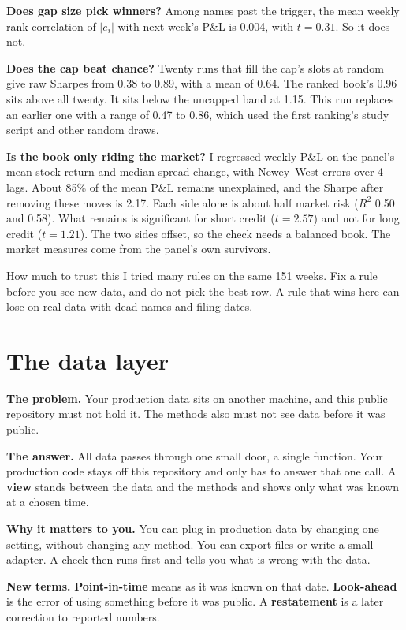 \documentclass[11pt]{article}
\newcommand{\term}[1]{\textbf{#1}}
\newcommand{\fn}[1]{\texttt{\detokenize{#1}}}
\begin{document}
\begin{techbox}[Three checks, computed by \fn{make_figs.py}]
\textbf{Does gap size pick winners?} Among names past the trigger, the mean weekly rank correlation of $|e_i|$ with next week's P\&L is 0.004, with $t=0.31$. So it does not.

\textbf{Does the cap beat chance?} Twenty runs that fill the cap's slots at random give raw Sharpes from 0.38 to 0.89, with a mean of 0.64. The ranked book's 0.96 sits above all twenty. It sits below the uncapped band at 1.15. This run replaces an earlier one with a range of 0.47 to 0.86, which used the first ranking's study script and other random draws.

\textbf{Is the book only riding the market?} I regressed weekly P\&L on the panel's mean stock return and median spread change, with Newey--West errors over 4 lags. About 85\% of the mean P\&L remains unexplained, and the Sharpe after removing these moves is 2.17. Each side alone is about half market risk ($R^2$ 0.50 and 0.58). What remains is significant for short credit ($t=2.57$) and not for long credit ($t=1.21$). The two sides offset, so the check needs a balanced book. The market measures come from the panel's own survivors.
\end{techbox}

\begin{warnbox}{How much to trust this}
I tried many rules on the same 151 weeks. Fix a rule before you see new data, and do not pick the best row. A rule that wins here can lose on real data with dead names and filing dates.
\end{warnbox}

\section{The data layer}\label{sec:data}

\begin{plainbox}
\term{The problem.} Your production data sits on another machine, and this public repository must not hold it. The methods also must not see data before it was public.

\term{The answer.} All data passes through one small door, a single \fn{read} function. Your production code stays off this repository and only has to answer that one call. A \term{view} stands between the data and the methods and shows only what was known at a chosen time.

\term{Why it matters to you.} You can plug in production data by changing one setting, without changing any method. You can export files or write a small adapter. A check then runs first and tells you what is wrong with the data.

\term{New terms.} \term{Point-in-time} means as it was known on that date. \term{Look-ahead} is the error of using something before it was public. A \term{restatement} is a later correction to reported numbers.
\end{plainbox}
\end{document}
